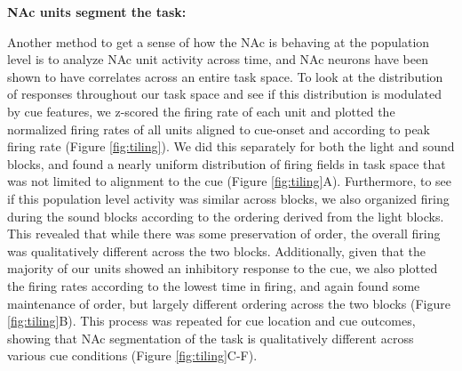 \documentclass[11pt]{article}
\begin{document}
{\bf NAc units segment the task:}

Another method to get a sense of how the NAc is behaving at the population level is to analyze NAc unit activity across time, and NAc neurons have been shown to have correlates across an entire task space. To look at the distribution of responses throughout our task space and see if this distribution is modulated by cue features, we z-scored the firing rate of each unit and plotted the normalized firing rates of all units aligned to cue-onset and according to peak firing rate (Figure \ref{fig:tiling}). We did this separately for both the light and sound blocks, and found a nearly uniform distribution of firing fields in task space that was not limited to alignment to the cue (Figure \ref{fig:tiling}A). Furthermore, to see if this population level activity was similar across blocks, we also organized firing during the sound blocks according to the ordering derived from the light blocks. This revealed that while there was some preservation of order, the overall firing was qualitatively different across the two blocks. Additionally, given that the majority of our units showed an inhibitory response to the cue, we also plotted the firing rates according to the lowest time in firing, and again found some maintenance of order, but largely different ordering across the two blocks (Figure \ref{fig:tiling}B). This process was repeated for cue location and cue outcomes, showing that NAc segmentation of the task is qualitatively different across various cue conditions  (Figure \ref{fig:tiling}C-F). 
\end{document}
